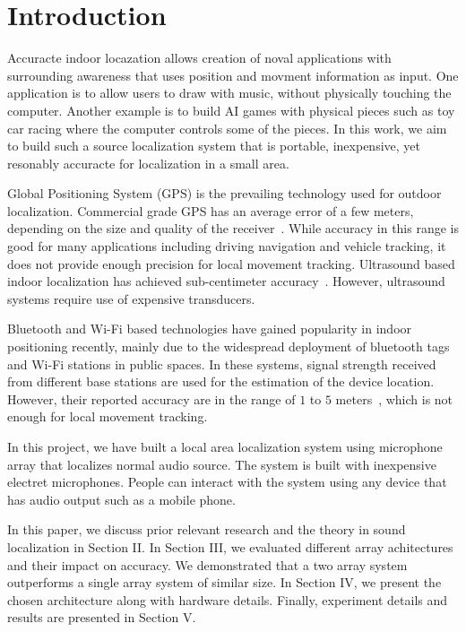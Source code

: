 \section{Introduction}


Accuracte indoor locazation allows creation of noval applications with surrounding awareness that uses position and movment information as input. One application is to allow users to draw with music, without physically touching the computer. Another example is to build AI games with physical pieces such as toy car racing where the computer controls some of the pieces. In this work, we aim to build such a source localization system that is portable, inexpensive, yet resonably accuracte for localization in a small area. 

Global Positioning System (GPS) is the prevailing technology used for outdoor localization. Commercial grade GPS has an average error of a few meters, depending on the size and quality of the receiver~\cite{intro:gps}. While accuracy in this range is good for many applications including driving navigation and vehicle tracking, it does not provide enough precision for local movement tracking. Ultrasound based indoor localization has achieved sub-centimeter accuracy~\cite{intro:ultra}. However, ultrasound systems require use of expensive transducers.

Bluetooth and Wi-Fi based technologies have gained popularity in indoor positioning recently, mainly due to the widespread deployment of bluetooth tags and Wi-Fi stations in public spaces. In these systems, signal strength received from different base stations are used for the estimation of the device location. However, their reported accuracy are in the range of $1$ to $5$ meters~\cite{intro:blue, intro:loc}, which is not enough for local movement tracking.

In this project, we have built a local area localization system using microphone array that localizes normal audio source. The system is built with inexpensive electret microphones. People can interact with the system using any device that has audio output such as a mobile phone.

In this paper, we discuss prior relevant research and the theory in sound localization in Section II. In Section III, we evaluated different array achitectures and their impact on accuracy. We demonstrated that a two array system outperforms a single array system of similar size. In Section IV, we present the chosen architecture along with hardware details. Finally, experiment details and results are presented in Section V.
